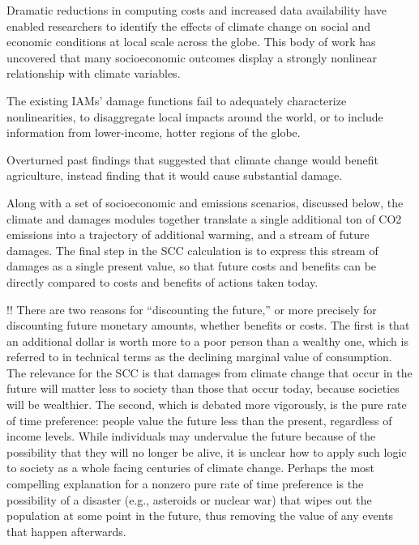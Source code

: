 \documentclass[
]{book}
\begin{document}
Dramatic reductions in computing costs and increased data availability have
enabled researchers to identify the effects of climate change on social and
economic conditions at local scale across the globe. This body of work has
uncovered that many socioeconomic outcomes display a strongly nonlinear
relationship with climate variables.

The existing IAMs' damage functions fail to adequately characterize
nonlinearities, to disaggregate local impacts around the world, or to include
information from lower-income, hotter regions of the globe.

Overturned past findings that suggested that
climate change would benefit agriculture, instead finding that it would cause substantial
damage.

Along with a set of socioeconomic and emissions scenarios, discussed below,
the climate and damages modules together translate a single additional ton of CO2
emissions into a trajectory of additional warming, and a stream of future damages. The
final step in the SCC calculation is to express this stream of damages as a single present
value, so that future costs and benefits can be directly compared to costs and benefits of
actions taken today.

!!
There are two reasons for ``discounting the future,'' or more precisely for discounting
future monetary amounts, whether benefits or costs. The first is that an additional
dollar is worth more to a poor person than a wealthy one, which is referred to in
technical terms as the declining marginal value of consumption. The relevance for the
SCC is that damages from climate change that occur in the future will matter less to
society than those that occur today, because societies will be wealthier. The second,
which is debated more vigorously, is the pure rate of time preference: people value the
future less than the present, regardless of income levels. While individuals may
undervalue the future because of the possibility that they will no longer be alive, it is
unclear how to apply such logic to society as a whole facing centuries of climate change.
Perhaps the most compelling explanation for a nonzero pure rate of time preference is
the possibility of a disaster (e.g., asteroids or nuclear war) that wipes out the population
at some point in the future, thus removing the value of any events that happen
afterwards.
\end{document}
